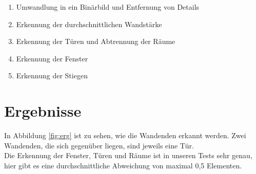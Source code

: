 \documentclass[deutsch]{scrartcl}
\begin{document}
\begin{enumerate}
	\item Umwandlung in ein Binärbild und Entfernung von Details
	\item Erkennung der durchschnittlichen Wandstärke
	\item Erkennung der Türen und Abtrennung der Räume
	\item Erkennung der Fenster
	\item Erkennung der Stiegen
	
\end{enumerate}

\section*{Ergebnisse}
In Abbildung \ref{fig:erg} ist zu sehen, wie die Wandenden erkannt werden. Zwei Wandenden, die sich gegenüber liegen, sind jeweils eine Tür. \\
Die Erkennung der Fenster, Türen und Räume ist in unseren Tests sehr genau, hier gibt es eine durchschnittliche Abweichung von maximal 0,5 Elementen.
\end{document}
